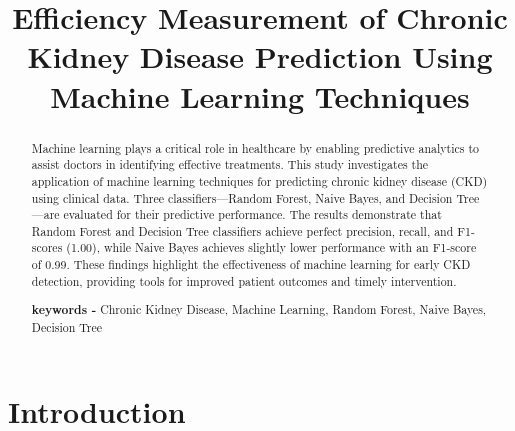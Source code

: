\documentclass[conference]{IEEEtran}
\begin{document}
\title{Efficiency Measurement of Chronic Kidney Disease
Prediction Using Machine Learning Techniques}

\author{

}
\maketitle
\IEEEpubidadjcol
\sloppy
\begin{abstract}
Machine learning plays a critical role in healthcare by enabling predictive analytics to assist doctors in identifying effective treatments. This study investigates the application of machine learning techniques for predicting chronic kidney disease (CKD) using clinical data. Three classifiers—Random Forest, Naive Bayes, and Decision Tree—are evaluated for their predictive performance. The results demonstrate that Random Forest and Decision Tree classifiers achieve perfect precision, recall, and F1-scores (1.00), while Naive Bayes achieves slightly lower performance with an F1-score of 0.99. These findings highlight the effectiveness of machine learning for early CKD detection, providing tools for improved patient outcomes and timely intervention.


\textbf{keywords - }{Chronic Kidney Disease, Machine Learning, Random Forest, Naive Bayes, Decision Tree}

\end{abstract}
%
%
%
\section{Introduction}
\end{document}
